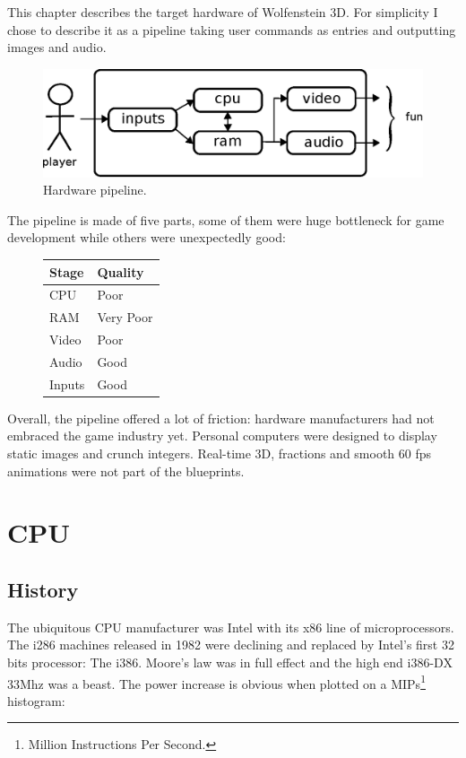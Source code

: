 \documentclass[book.tex]{subfiles}
\begin{document}
This chapter describes the target hardware of Wolfenstein 3D. For simplicity I chose to describe it as
a pipeline taking user commands as entries and outputting images and audio.

\begin{figure}[H]
\centering
\includegraphics[scale=0.7]{imgs/fun_pipeline.eps}
%
\caption{Hardware pipeline.}
\label{fig:digraph}
\end{figure}

The pipeline is made of five parts, some of them were huge bottleneck for game development while others were unexpectedly
good:

\begin{figure}[H]
\centering
\begin{tabularx}{\textwidth}{ X X  }
  \toprule
  \textbf{Stage} & \textbf{Quality} \\ \bottomrule
  CPU & Poor \\ 
  RAM & Very Poor \\ 
  Video & Poor \\ 
  Audio & Good \\ 
  Inputs & Good \\ \bottomrule
\end{tabularx}
\label{fig:Pipeline stages}
\end{figure}

Overall, the pipeline offered a lot of friction: hardware manufacturers had not embraced the game industry yet. Personal computers were designed to display static images and crunch integers. Real-time 3D, fractions and smooth 60 fps animations were not part of the blueprints.

\section{CPU}
  \subsection{History}
  The ubiquitous CPU manufacturer was Intel with its x86 line of microprocessors.  The i286 machines released in 1982 were declining and replaced by Intel's first 32 bits processor: The i386. Moore's law was in full effect and the high end i386-DX 33Mhz was a beast. The power increase is obvious when plotted on a MIPs\footnote{Million Instructions Per Second.} histogram:
\end{document}
